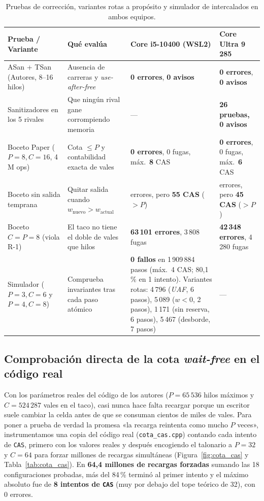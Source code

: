 \documentclass[11pt,a4paper]{article}
\begin{document}
\begin{table}[H]
\centering
\caption{Pruebas de corrección, variantes rotas a propósito y simulador de intercalados en ambos equipos.}
\label{tab:correccion}
\small
\begin{tabularx}{\linewidth}{@{}l >{\raggedright\arraybackslash}X >{\raggedright\arraybackslash}X >{\raggedright\arraybackslash}X@{}}
\toprule
\textbf{Prueba / Variante} & \textbf{Qué evalúa} & \textbf{Core i5-10400 (WSL2)} & \textbf{Core Ultra 9 285} \\
\midrule
ASan + TSan (Autores, 8--16 hilos) & Ausencia de carreras y \emph{use-after-free} & \textbf{0 errores}, \textbf{0 avisos} & \textbf{0 errores}, \textbf{0 avisos} \\
Sanitizadores en los 5 rivales & Que ningún rival gane corrompiendo memoria & — & \textbf{26 pruebas, 0 avisos} \\
Boceto Paper ($P=8, C=16$, 4\,M ops) & Cota $\le P$ y contabilidad exacta de vales & \textbf{0 errores}, 0 fugas, máx.\ \textbf{8} CAS & \textbf{0 errores}, 0 fugas, máx.\ \textbf{6} CAS \\
Boceto sin salida temprana & Quitar salida cuando $w_{\text{nuevo}} > w_{\text{actual}}$ & 0 errores, pero \textbf{55 CAS} ($> P$) & 0 errores, pero \textbf{45 CAS} ($> P$) \\
Boceto $C = P = 8$ (viola R-1) & El taco no tiene el doble de vales que hilos & \textbf{63\,101 errores}, 3\,808 fugas & \textbf{42\,348 errores}, 4\,280 fugas \\
Simulador ($P=3, C=6$ y $P=4, C=8$) & Comprueba invariantes tras cada paso atómico & \textbf{0 fallos} en 1\,909\,884 pasos (máx.\ 4 CAS; 80,1\,\% en 1 intento). Variantes rotas: 4\,796 (\emph{UAF}, 6 pasos), 5\,089 ($w<0$, 2 pasos), 1\,171 (sin reserva, 6 pasos), 5\,467 (desborde, 7 pasos) & — \\
\bottomrule
\end{tabularx}
\end{table}

\subsection{Comprobación directa de la cota \emph{wait-free} en el código real}
Con los parámetros reales del código de los autores ($P = 65\,536$ hilos máximos y $C = 524\,287$ vales en el taco), casi nunca hace falta recargar porque un escritor suele cambiar la celda antes de que se consuman cientos de miles de vales. Para poner a prueba de verdad la promesa «la recarga reintenta como mucho $P$ veces», instrumentamos una copia del código real (\texttt{cota\_cas.cpp}) contando cada intento de \texttt{CAS}, primero con los valores reales y después encogiendo el talonario a $P = 32$ y $C = 64$ para forzar millones de recargas simultáneas (Figura~\ref{fig:cota_cas} y Tabla~\ref{tab:cota_cas}). En \textbf{64,4 millones de recargas forzadas} sumando las 18 configuraciones probadas, más del 84\,\% terminó al primer intento y el máximo absoluto fue de \textbf{8 intentos de \texttt{CAS}} (muy por debajo del tope teórico de 32), con 0 errores.
\end{document}
